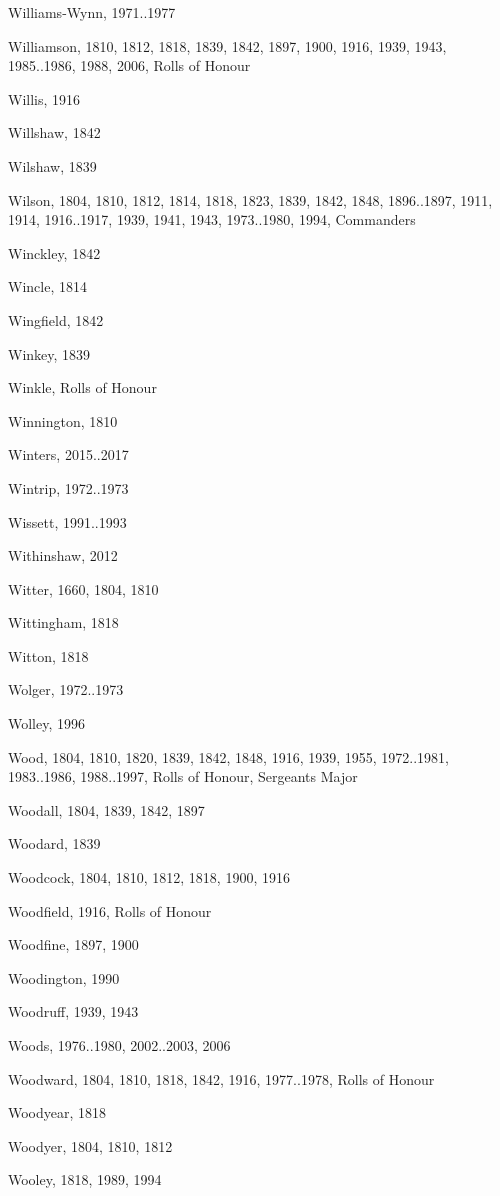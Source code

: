 {\begin{theindex}
\item Williams-Wynn, 1971..1977
\item Williamson, 1810, 1812, 1818, 1839, 1842, 1897, 1900, 1916, 1939, 1943, 1985..1986, 1988, 2006, Rolls of Honour
\item Willis, 1916
\item Willshaw, 1842
\item Wilshaw, 1839
\item Wilson, 1804, 1810, 1812, 1814, 1818, 1823, 1839, 1842, 1848, 1896..1897, 1911, 1914, 1916..1917, 1939, 1941, 1943, 1973..1980, 1994, Commanders
\item Winckley, 1842
\item Wincle, 1814
\item Wingfield, 1842
\item Winkey, 1839
\item Winkle, Rolls of Honour
\item Winnington, 1810
\item Winters, 2015..2017
\item Wintrip, 1972..1973
\item Wissett, 1991..1993
\item Withinshaw, 2012
\item Witter, 1660, 1804, 1810
\item Wittingham, 1818
\item Witton, 1818
\item Wolger, 1972..1973
\item Wolley, 1996
\item Wood, 1804, 1810, 1820, 1839, 1842, 1848, 1916, 1939, 1955, 1972..1981, 1983..1986, 1988..1997, Rolls of Honour, Sergeants Major
\item Woodall, 1804, 1839, 1842, 1897
\item Woodard, 1839
\item Woodcock, 1804, 1810, 1812, 1818, 1900, 1916
\item Woodfield, 1916, Rolls of Honour
\item Woodfine, 1897, 1900
\item Woodington, 1990
\item Woodruff, 1939, 1943
\item Woods, 1976..1980, 2002..2003, 2006
\item Woodward, 1804, 1810, 1818, 1842, 1916, 1977..1978, Rolls of Honour
\item Woodyear, 1818
\item Woodyer, 1804, 1810, 1812
\item Wooley, 1818, 1989, 1994

\end{theindex}}
